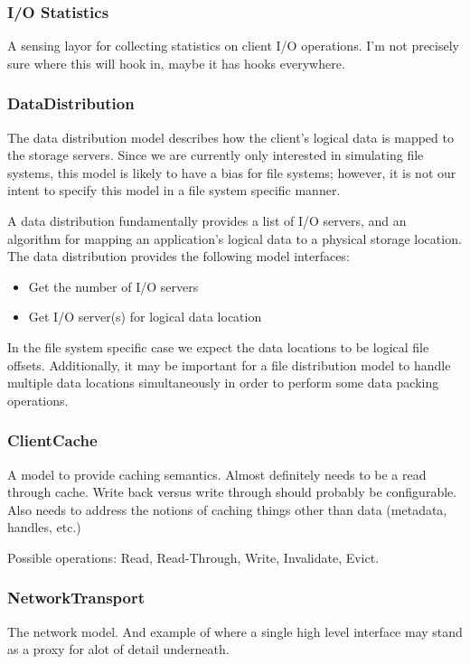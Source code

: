 \documentclass[11pt]{article}
\begin{document}
\subsubsection{I/O Statistics}
A sensing layor for collecting statistics on client I/O operations.  I'm not
precisely sure where this will hook in, maybe it has hooks everywhere.

\subsubsection{DataDistribution}
The data distribution model describes how the client's logical data is mapped
to the storage servers.  Since we are currently only interested in simulating
file systems, this model is likely to have a bias for file systems; however, it
is not our intent to specify this model in a file system specific manner.

A data distribution fundamentally provides a list of I/O servers, and an
algorithm for mapping an application's logical data to a physical storage
location.  The data distribution provides the following model interfaces:

\begin{itemize}
\item Get the number of I/O servers
\item Get I/O server(s) for logical data location
\end{itemize}

In the file system specific case we expect the data locations to be logical 
file offsets.  Additionally, it may be important for a file distribution
model to handle multiple data locations simultaneously in order to perform
some data packing operations.

\subsubsection{ClientCache}
A model to provide caching semantics.  Almost definitely needs to be a read
through cache.  Write back versus write through should probably be
configurable.  Also needs to address the notions of caching things other than
data (metadata, handles, etc.)

Possible operations:  Read, Read-Through, Write, Invalidate, Evict.

\subsubsection{NetworkTransport}
The network model.  And example of where a single high level interface may
stand as a proxy for alot of detail underneath.
\end{document}
